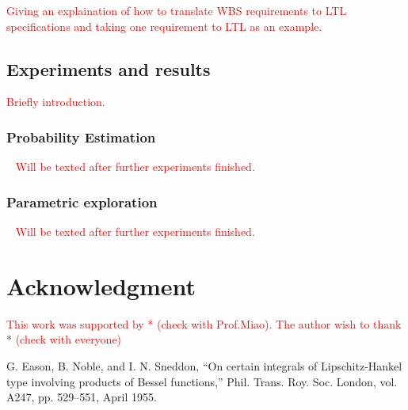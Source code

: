 \documentclass[conference]{IEEEtran}
\begin{document}
\textcolor{red}{
Giving an explaination of how to translate WBS requirements to LTL specifications and taking one requirement to LTL as an example.
}

\subsection{Experiments and results}
\textcolor{red}{
Briefly introduction.
}

\subsubsection{Probability Estimation}
\ 
\newline 
\textcolor{red}{
\indent Will be texted after further experiments finished.
}

\subsubsection{Parametric exploration}
\ 
\newline 
\textcolor{red}{
	\indent Will be texted after further experiments finished.
}

\section*{Acknowledgment}
\textcolor{red}{
This work was supported by * (check with Prof.Miao). The author wish to thank * (check with everyone)
}

\begin{thebibliography}{00}
 G. Eason, B. Noble, and I. N. Sneddon, ``On certain integrals of Lipschitz-Hankel type involving products of Bessel functions,'' Phil. Trans. Roy. Soc. London, vol. A247, pp. 529--551, April 1955.
\end{thebibliography}
\end{document}
